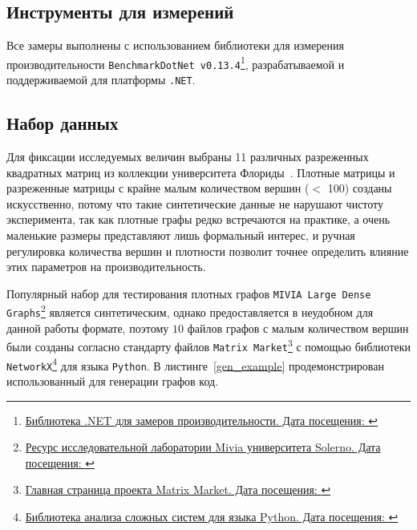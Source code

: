 \subsection{Инструменты для измерений}
\noindent Все замеры выполнены с использованием библиотеки для измерения производительности \texttt{BenchmarkDotNet v0.13.4}\footnote{\href{https://benchmarkdotnet.org/}{Библиотека .NET для замеров производительности. Дата посещения: }}, разрабатываемой и поддерживаемой для платформы \texttt{.NET}.



\subsection{Набор данных}
\noindent Для фиксации исследуемых величин выбраны 11 различных разреженных квадратных матриц из коллекции университета Флориды~\cite{matrixData}. Плотные матрицы и разреженные матрицы с крайне малым количеством вершин ($<$ 100) созданы искусственно, потому что такие синтетические данные не нарушают чистоту эксперимента, так как плотные графы редко встречаются на практике, а очень маленькие размеры представляют лишь формальный интерес, и ручная регулировка количества вершин и плотности позволит точнее определить влияние этих параметров на производительность.

Популярный набор для тестирования плотных графов \texttt{MIVIA Large Dense Graphs}\footnote{\href{https://mivia.unisa.it/datasets/graph-database/mivia2-graph-database/}{Ресурс исследовательной лаборатории Mivia университета Solerno. Дата посещения: }} является синтетическим, однако предоставляется в неудобном для данной работы формате, поэтому $10$ файлов графов с малым количеством вершин были созданы согласно стандарту файлов \texttt{Matrix Market}\footnote{\href{https://math.nist.gov/MatrixMarket/}{Главная страница проекта Matrix Market. Дата посещения: }} с помощью библиотеки \texttt{NetworkX}\footnote{\href{https://networkx.org/}{Библиотека анализа сложных систем для языка Python. Дата посещения: }} для языка \texttt{Python}. В листинге~\ref{gen_example} продемонстрирован использованный для генерации графов код.

